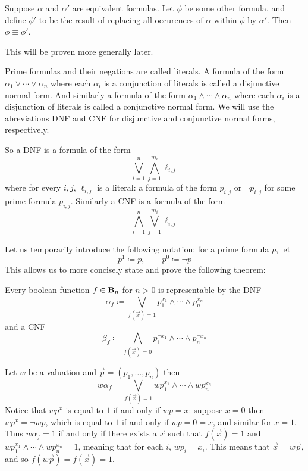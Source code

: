 \bthrm[title=The Replacement Theorem]

    Suppose $\alpha$ and $\alpha'$ are equivalent formulas.
    Let $\phi$ be some other formula, and define $\phi'$ to be the result of replacing all occurences of $\alpha$ within $\phi$ by $\alpha'$.
    Then $\phi\equiv\phi'$.

\ethrm

This will be proven more generally later.

\bdefn

    Prime formulas and their negations are called {\emphcolor literals}.
    A formula of the form $\alpha_1\lor\cdots\lor\alpha_n$ where each $\alpha_i$ is a conjunction of literals is called a {\emphcolor disjunctive normal form}.
    And similarly a formula of the form $\alpha_1\land\cdots\land\alpha_n$ where each $\alpha_i$ is a disjunction of literals is called a {\emphcolor conjunctive normal form}.
    We will use the abreviations DNF and CNF for disjunctive and conjunctive normal forms, respectively.

\edefn

So a DNF is a formula of the form
$$ \bigvee_{i=1}^n\bigwedge_{j=1}^{m_i}\ell_{i,j} $$
where for every $i,j$, $\ell_{i,j}$ is a literal: a formula of the form $p_{i,j}$ or $\neg p_{i,j}$ for some prime formula $p_{i,j}$.
Similarly a CNF is a formula of the form
$$ \bigwedge_{i=1}^n\bigvee_{j=1}^{m_i}\ell_{i,j} $$

Let us temporarily introduce the following notation: for a prime formula $p$, let
$$ p^1 \coloneqq p,\qquad p^0 \coloneqq \neg p $$
This allows us to more concisely state and prove the following theorem:

\bthrm

    Every boolean function $f\in{\bf B}_n$ for $n>0$ is representable by the DNF
    $$ \alpha_f \coloneqq \bigvee_{f(\vec x)=1}p_1^{x_1}\land\cdots\land p_n^{x_n} $$
    and a CNF
    $$ \beta_f \coloneqq \bigwedge_{f(\vec x)=0}p_1^{\neg x_1}\land\cdots\land p_n^{\neg x_n} $$

\ethrm

Let $w$ be a valuation and $\vec p=(p_1,\dots,p_n)$ then
$$ w\alpha_f = \bigvee_{f(\vec x)=1}wp_1^{x_1}\land\cdots\land wp_n^{x_n} $$
Notice that $wp^x$ is equal to $1$ if and only if $wp=x$: suppose $x=0$ then $wp^x=\neg wp$, which is equal to $1$ if and only if $wp=0=x$, and similar for $x=1$.
Thus $w\alpha_f=1$ if and only if there exists a $\vec x$ such that $f(\vec x)=1$ and $wp_1^{x_1}\land\cdots\land wp_n^{x_n}=1$, meaning that for each $i$, $wp_i=x_i$.
This means that $\vec x=w\vec p$, and so $f(w\vec p)=f(\vec x)=1$.

